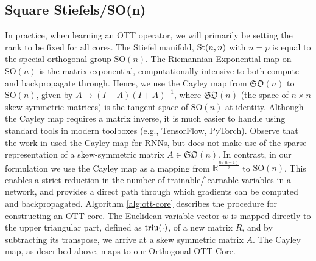 \subsection{Square Stiefels/SO(n)}
In practice, when learning an OTT operator, we will primarily be setting the rank to be fixed for all cores.
The Stiefel manifold, $\text{St}(n,n)$ with $n=p$ is equal to the special orthogonal group $\text{SO}(n)$.
The Riemannian Exponential map on $\text{SO}(n)$ is the matrix exponential, computationally intensive to both compute and backpropagate through.
Hence, we use the Cayley map from $\mathfrak{SO}(n)$ to $\text{SO}(n)$, given by $A \mapsto \left(I-A\right)\left(I+A\right)^{-1}$, where $\mathfrak{SO}(n)$ (the space of $n\times n$ skew-symmetric matrices) is the tangent space of $\text{SO}(n)$ at identity.
Although the Cayley map requires a matrix inverse, it is much easier to handle using standard tools
in modern toolboxes (e.g., TensorFlow, PyTorch).
Observe that
the work in \cite{helfrich2017orthogonal} used the Cayley map for RNNs, but does not make use of the sparse representation of a skew-symmetric matrix $A \in \mathfrak{SO}(n)$.
In contrast, in our formulation we use the Cayley map as a mapping from $\mathbb{R}^{\frac{n(n-1)}{2}}$ to $\text{SO}(n)$. This enables a strict reduction in the number of trainable/learnable variables in a network, and provides a direct path through which gradients can be computed and backpropagated.
Algorithm \ref{alg:ott-core} describes the procedure for constructing an OTT-core.
The Euclidean variable vector $w$ is mapped directly to the upper triangular part, defined as $\operatorname*{triu}(\cdot)$, of a new matrix $R$, and by subtracting its transpose,
we arrive at a skew symmetric matrix $A$. The Cayley map, as described above, maps to our Orthogonal OTT Core. 
